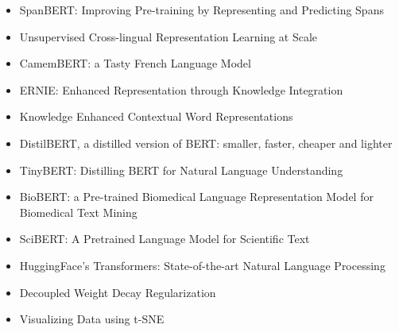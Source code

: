 \begin{itemize}
    \item {SpanBERT: Improving Pre-training by Representing and Predicting Spans} \cite{joshi2020spanbert}
    \item {Unsupervised Cross-lingual Representation Learning at Scale} \cite{conneau2019unsupervised}
    \item {CamemBERT: a Tasty French Language Model} \cite{martin2019camembert}
    \item {ERNIE: Enhanced Representation through Knowledge Integration} \cite{sun2019ernie}
    \item {Knowledge Enhanced Contextual Word Representations} \cite{peters2019knowledge}
    \item {DistilBERT, a distilled version of BERT: smaller, faster, cheaper and lighter} \cite{sanh2019distilbert}
    \item {TinyBERT: Distilling BERT for Natural Language Understanding} \cite{jiao2019tinybert}
    \item {BioBERT: a Pre-trained Biomedical Language Representation Model for Biomedical Text Mining} \cite{lee2020biobert}
    \item {SciBERT: A Pretrained Language Model for Scientific Text} \cite{beltagy2019scibert}
    \item {HuggingFace's Transformers: State-of-the-art Natural Language Processing} \cite{wolf2019huggingface}
    \item {Decoupled Weight Decay Regularization} \cite{loshchilov2017decoupled}
    \item {Visualizing Data using t-SNE} \cite{vandermaaten2008visualizing}
\end{itemize}